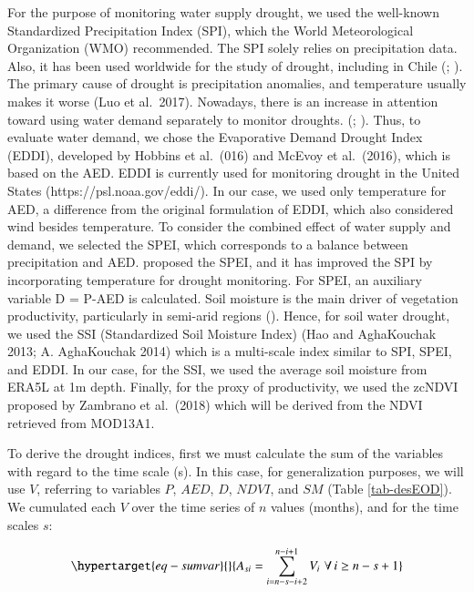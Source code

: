 \documentclass[
  authoryear,
  preprint,
  3p,
  onecolumn]{elsarticle}
\begin{document}
For the purpose of monitoring water supply drought, we used the
well-known Standardized Precipitation Index (SPI), which the World
Meteorological Organization (WMO) recommended. The SPI solely relies on
precipitation data. Also, it has been used worldwide for the study of
drought, including in Chile (\citet{Garreaud2017};
\citet{Zambrano2017}). The primary cause of drought is precipitation
anomalies, and temperature usually makes it worse (Luo et al.~2017).
Nowadays, there is an increase in attention toward using water demand
separately to monitor droughts. (\citet{Vicente-Serrano2020};
\citet{Noguera2022}). Thus, to evaluate water demand, we chose the
Evaporative Demand Drought Index (EDDI), developed by Hobbins et
al.~(016) and McEvoy et al.~(2016), which is based on the AED. EDDI is
currently used for monitoring drought in the United States
(https://psl.noaa.gov/eddi/). In our case, we used only temperature for
AED, a difference from the original formulation of EDDI, which also
considered wind besides temperature. To consider the combined effect of
water supply and demand, we selected the SPEI, which corresponds to a
balance between precipitation and AED. \citet{Vicente-Serrano2010}
proposed the SPEI, and it has improved the SPI by incorporating
temperature for drought monitoring. For SPEI, an auxiliary variable D =
P-AED is calculated. Soil moisture is the main driver of vegetation
productivity, particularly in semi-arid regions (\citet{Li2022}). Hence,
for soil water drought, we used the SSI (Standardized Soil Moisture
Index) (Hao and AghaKouchak 2013; A. AghaKouchak 2014) which is a
multi-scale index similar to SPI, SPEI, and EDDI. In our case, for the
SSI, we used the average soil moisture from ERA5L at 1m depth. Finally,
for the proxy of productivity, we used the zcNDVI proposed by Zambrano
et al.~(2018) which will be derived from the NDVI retrieved from
MOD13A1.

To derive the drought indices, first we must calculate the sum of the
variables with regard to the time scale (s). In this case, for
generalization purposes, we will use \(V\), referring to variables
\(P\), \(AED\), \(D\), \(NDVI\), and \(SM\) (Table \ref{tab-desEOD}). We
cumulated each \(V\) over the time series of \(n\) values (months), and
for the time scales \(s\):

\begin{equation}\protect\hypertarget{eq-sumvar}{}{A_{si} = \sum_{i=n-s-i+2}^{n-i+1} V_i\,\, \forall\, i\geq n-s+1  }\label{eq-sumvar}\end{equation}
\end{document}
